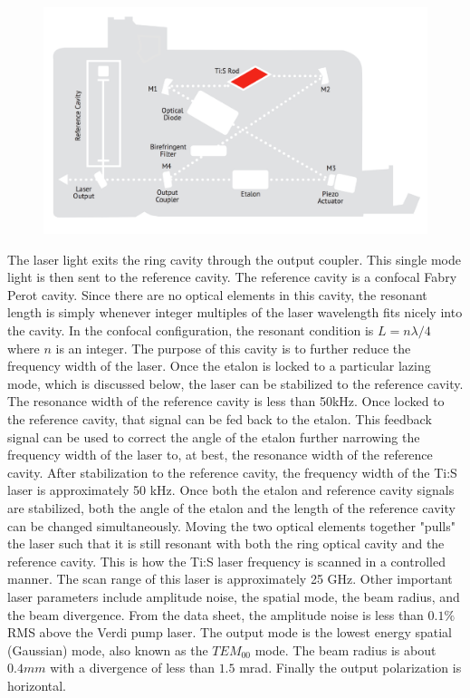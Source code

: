 \documentclass[prb,preprint]{revtex4-1}
\begin{document}
\begin{figure}[h!]
\centering
\includegraphics[width=6in]{InsideTiS.pdf}
\caption{}
\label{InsideTiS}
\end{figure}
The laser light exits the ring cavity through the output coupler.  This single mode light is then sent to the reference cavity.  The reference cavity is a confocal Fabry Perot cavity.  Since there are no optical elements in this cavity, the resonant length is simply whenever integer multiples of the laser wavelength fits nicely into the cavity.  In the confocal configuration, the resonant condition is $L=n \lambda/4$ where $n$ is an integer.  The purpose of this cavity is to further reduce the frequency width of the laser.  Once the etalon is locked to a particular lazing mode, which is discussed below, the laser can be stabilized to the reference cavity.  The resonance width of the reference cavity is less than 50kHz.  Once locked to the reference cavity, that signal can be fed back to the etalon.  This feedback signal can be used to correct the angle of the etalon further narrowing the frequency width of the laser to, at best, the resonance width of the reference cavity.  After stabilization to the reference cavity, the frequency width of the Ti:S laser is approximately 50 kHz.
Once both the etalon and reference cavity signals are stabilized, both the angle of the etalon and the length of the reference cavity can be changed simultaneously.  Moving the two optical elements together "pulls" the laser such that it is still resonant with both the ring optical cavity and the reference cavity.  This is how the Ti:S laser frequency is scanned in a controlled manner.  The scan range of this laser is approximately 25 GHz.
Other important laser parameters include amplitude noise, the spatial mode, the beam radius, and the beam divergence.  From the data sheet, the amplitude noise is less than $0.1\%$ RMS above the Verdi pump laser.  The output mode is the lowest energy spatial (Gaussian) mode, also known as the ${TEM}_{00}$ mode.  The beam radius is about $0.4 mm$ with a divergence of less than $1.5$ mrad.  Finally the output polarization is horizontal.
\end{document}
